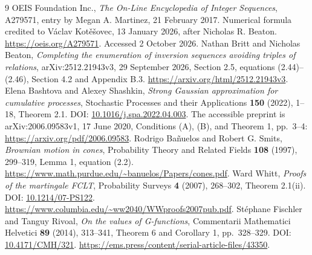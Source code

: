 \documentclass[11pt,letterpaper]{article}
\theoremstyle{remark}\newtheorem{remark}[theorem]{Remark}
\newcommand{\1}{\mathbf1}
\begin{document}
\begin{thebibliography}{9}
 OEIS Foundation Inc., \emph{The On-Line Encyclopedia of Integer
Sequences}, A279571, entry by Megan A. Martinez, 21 February 2017.
Numerical formula credited to V\'aclav Kot\v{e}\v{s}ovec, 13 January 2026,
after Nicholas R. Beaton. \url{https://oeis.org/A279571}.
Accessed 2 October 2026.
 Nathan Britt and Nicholas Beaton,
\emph{Completing the enumeration of inversion sequences avoiding triples
of relations}, arXiv:2512.21943v3, 29 September 2026, Section 2.5,
equations (2.44)--(2.46), Section 4.2 and Appendix B.3.
\url{https://arxiv.org/html/2512.21943v3}.
 Elena Bashtova and Alexey Shashkin,
\emph{Strong Gaussian approximation for cumulative processes},
Stochastic Processes and their Applications \textbf{150} (2022), 1--18,
Theorem 2.1. DOI:
\href{https://doi.org/10.1016/j.spa.2022.04.003}{10.1016/j.spa.2022.04.003}.
The accessible preprint is arXiv:2006.09583v1, 17 June 2020,
Conditions (A), (B), and Theorem 1, pp.~3--4:
\url{https://arxiv.org/pdf/2006.09583}.
 Rodrigo Ba\~nuelos and Robert G. Smits,
\emph{Brownian motion in cones}, Probability Theory and Related Fields
\textbf{108} (1997), 299--319, Lemma 1, equation (2.2).
\url{https://www.math.purdue.edu/~banuelos/Papers/cones.pdf}.
 Ward Whitt, \emph{Proofs of the martingale FCLT},
Probability Surveys \textbf{4} (2007), 268--302, Theorem 2.1(ii).
DOI: \href{https://doi.org/10.1214/07-PS122}{10.1214/07-PS122}.
\url{https://www.columbia.edu/~ww2040/WWproofs2007pub.pdf}.
 St\'ephane Fischler and Tanguy Rivoal,
\emph{On the values of G-functions}, Commentarii Mathematici Helvetici
\textbf{89} (2014), 313--341, Theorem 6 and Corollary 1, pp.~328--329.
DOI: \href{https://doi.org/10.4171/CMH/321}{10.4171/CMH/321}.
\url{https://ems.press/content/serial-article-files/43350}.
\end{thebibliography}
\end{document}
